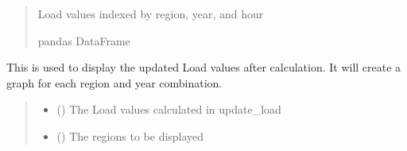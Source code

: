 \documentclass[letterpaper,10pt,english]{sphinxmanual}
\begin{document}
\begin{fulllineitems}
\begin{fulllineitems}
\begin{quote}
\begin{description}
\sphinxAtStartPar
Load values indexed by region, year, and hour

\sphinxAtStartPar
pandas DataFrame

\end{description}\end{quote}

\end{fulllineitems}


\begin{fulllineitems}
\label{\detokenize{src.models.residential.scripts.residential:src.models.residential.scripts.residential.residentialModule.view_output_load}}
\pysigstartsignatures
\pysiglinewithargsret
{}
{\sphinxparamcomma {}\sphinxparamcomma {}}
{}
\pysigstopsignatures
\sphinxAtStartPar
This is used to display the updated Load values after calculation. It will create a
graph for each region and year combination.
\begin{quote}\begin{description}
\begin{itemize}
\item {} 
\sphinxAtStartPar
{} () \textendash{} The Load values calculated in update\_load

\item {} 
\sphinxAtStartPar
{} (\sphinxstyleliteralemphasis{\sphinxupquote{{[}}}\sphinxstyleliteralemphasis{\sphinxupquote{{]}}}\sphinxstyleliteralemphasis{\sphinxupquote{, }}) \textendash{} The regions to be displayed


\end{itemize}
\end{description}
\end{quote}
\end{fulllineitems}
\end{fulllineitems}
\end{document}
